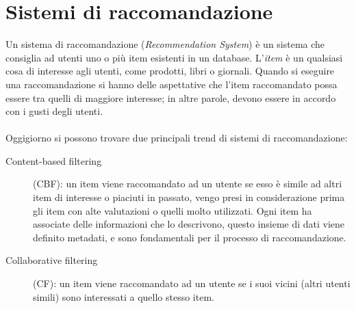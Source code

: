 \newpage

\section{Sistemi di raccomandazione}
Un sistema di raccomandazione (\textit{Recommendation System}) è un sistema che consiglia ad utenti uno o più item esistenti 
in un database. L'\textit{item} è un qualsiasi cosa di interesse agli utenti, come prodotti, libri o giornali. Quando si eseguire
una raccomandazione si hanno delle aspettative che l'item raccomandato possa essere tra quelli di maggiore interesse; in altre parole, 
devono essere in accordo con i gusti degli utenti. 
\ \\
\ \\
Oggigiorno si possono trovare due principali trend di sistemi di raccomandazione: 
\begin{description}
	\item[Content-based filtering](CBF): un item viene raccomandato ad un utente se esso è simile ad altri item di interesse o piaciuti
	in passato, vengo presi in considerazione prima gli item con alte valutazioni o quelli molto utilizzati. Ogni item ha associate
	delle informazioni che lo descrivono, questo insieme di dati viene definito metadati, e sono fondamentali per il processo di 
	raccomandazione. 
	\item[Collaborative filtering](CF): un item viene raccomandato ad un utente se i suoi vicini (altri utenti simili) sono 
	interessati a quello stesso item.   
\end{description}

